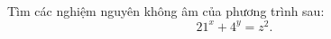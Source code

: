 \ifshowproblem
\begin{problem}\label{example:ROU-2015-JBMO-TST-D1-P4}
    Tìm các nghiệm nguyên không âm của phương trình sau:  
    \[ 21^x + 4^y = z^2. \] 
\end{problem}
\fi

\footnotemark
{}
\fi